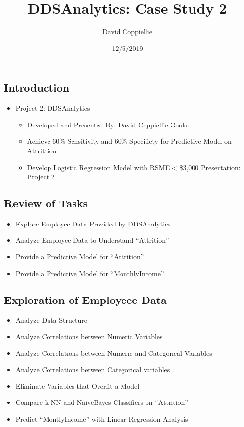\documentclass[]{article}
\title{DDSAnalytics: Case Study 2}
\author{David Coppiellie}
\date{12/5/2019}
\providecommand{\tightlist}{%
  \setlength{\itemsep}{0pt}\setlength{\parskip}{0pt}}
\begin{document}
\maketitle

\hypertarget{introduction}{%
\subsection{Introduction}\label{introduction}}

\begin{itemize}
\tightlist
\item
  Project 2: DDSAnalytics

  \begin{itemize}
  \tightlist
  \item
    Developed and Presented By: David Coppiellie Goals:
  \item
    Achieve 60\% Sensitivity and 60\% Specificty for Predictive Model on
    Attrittion
  \item
    Develop Logistic Regression Model with RSME \textless{} \$3,000
    Presentation:
    \href{https://www.youtube.com/watch?v=XnEKwkAcfhg\&t=10s}{Project 2}
  \end{itemize}
\end{itemize}

\hypertarget{review-of-tasks}{%
\subsection{Review of Tasks}\label{review-of-tasks}}

\begin{itemize}
\tightlist
\item
  Explore Employee Data Provided by DDSAnalytics
\item
  Analyze Employee Data to Understand ``Attrition''
\item
  Provide a Predictive Model for ``Attrition''
\item
  Provide a Predictive Model for ``MonthlyIncome''
\end{itemize}

\hypertarget{exploration-of-employeee-data}{%
\subsection{Exploration of Employeee
Data}\label{exploration-of-employeee-data}}

\begin{itemize}
\tightlist
\item
  Analyze Data Structure
\item
  Analyze Correlations between Numeric Variables
\item
  Analyze Correlations between Numeric and Categorical Variables
\item
  Analyze Correlations between Categorical variables
\item
  Eliminate Variables that Overfit a Model
\item
  Compare k-NN and NaiveBayes Classifiers on ``Attrition''
\item
  Predict ``MontlyIncome'' with Linear Regression Analysis
\end{itemize}
\end{document}
